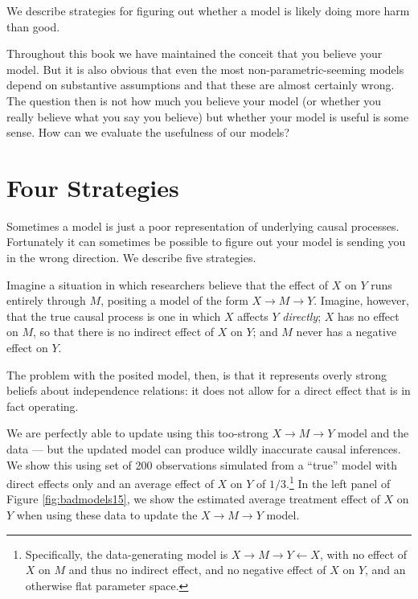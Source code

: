\documentclass[
  12pt,
]{book}
\newenvironment{headerbox}{
  \definecolor{shadecolor}{rgb}{0.8, 0.8, 0.8}  %
  \color{black}
  \begin{shaded}}{\end{shaded}}
\begin{document}
\begin{headerbox}
We describe strategies for figuring out whether a model is likely doing more harm than good.

\end{headerbox}

Throughout this book we have maintained the conceit that you believe your model. But it is also obvious that even the most non-parametric-seeming models depend on substantive assumptions and that these are almost certainly wrong. The question then is not how much you believe your model (or whether you really believe what you say you believe) but whether your model is useful is some sense. How can we evaluate the usefulness of our models?

\hypertarget{four-strategies}{%
\section{Four Strategies}\label{four-strategies}}

Sometimes a model is just a poor representation of underlying causal processes. Fortunately it can sometimes be possible to figure out your model is sending you in the wrong direction. We describe five strategies.

Imagine a situation in which researchers believe that the effect of \(X\) on \(Y\) runs entirely through \(M\), positing a model of the form \(X \rightarrow M \rightarrow Y\). Imagine, however, that the true causal process is one in which \(X\) affects \(Y\) \emph{directly}; \(X\) has no effect on \(M\), so that there is no indirect effect of \(X\) on \(Y\); and \(M\) never has a negative effect on \(Y\).

The problem with the posited model, then, is that it represents overly strong beliefs about independence relations: it does not allow for a direct effect that is in fact operating.

We are perfectly able to update using this too-strong \(X \rightarrow M \rightarrow Y\) model and the data --- but the updated model can produce wildly inaccurate causal inferences. We show this using set of 200 observations simulated from a ``true'' model with direct effects only and an average effect of \(X\) on \(Y\) of \(1/3\).\footnote{Specifically, the data-generating model is \(X \rightarrow M \rightarrow Y \leftarrow X\), with no effect of \(X\) on \(M\) and thus no indirect effect, and no negative effect of \(X\) on \(Y\), and an otherwise flat parameter space.} In the left panel of Figure \ref{fig:badmodels15}, we show the estimated average treatment effect of \(X\) on \(Y\) when using these data to update the \(X \rightarrow M \rightarrow Y\) model.
\end{document}
